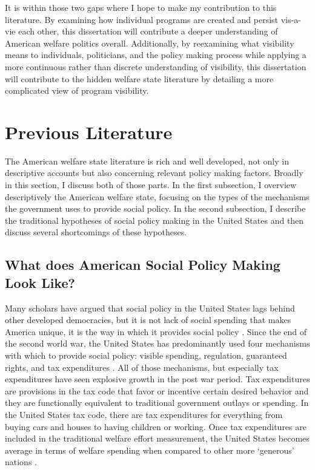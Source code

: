 \documentclass[12pt]{article}
\begin{document}
It is within those two gaps where I hope to make my contribution to this literature. By examining how individual programs are created and persist vis-a-vie each other, this dissertation will contribute a deeper understanding of American welfare politics overall. Additionally, by reexamining what visibility means to individuals, politicians, and the policy making process while applying a more continuous rather than discrete understanding of visibility, this dissertation will contribute to the hidden welfare state literature by detailing a more complicated view of program visibility.

\section{Previous Literature}

The American welfare state literature is rich and well developed, not only in descriptive accounts but also concerning relevant policy making factors. Broadly in this section, I discuss both of those parts. In the first subsection, I overview descriptively the American welfare state, focusing on the types of the mechanisms the government uses to provide social policy. In the second subsection, I describe the traditional hypotheses of social policy making in the United States and then discuss several shortcomings of these hypotheses. 

\subsection{What does American Social Policy Making Look Like?}
Many scholars have argued that social policy in the United States lags behind other developed democracies, but it is not lack of social spending that makes America unique, it is the way in which it provides social policy \citep{hacker2002}. Since the end of the second world war, the United States has predominantly used four mechanisms with which to provide social policy: visible spending, regulation, guaranteed rights, and tax expenditures \citep{pierson2007}. All of those mechanisms, but especially tax expenditures have seen explosive growth in the post war period. Tax expenditures are provisions in the tax code that favor or incentive certain desired behavior and they are functionally equivalent to traditional government outlays or spending. In the United States tax code, there are tax expenditures for everything from buying cars and houses to having children or working. Once tax expenditures are included in the traditional welfare effort measurement, the United States becomes average in terms of welfare spending when compared to other more `generous' nations \citep[Ch. 1]{howard2008}.
\end{document}
